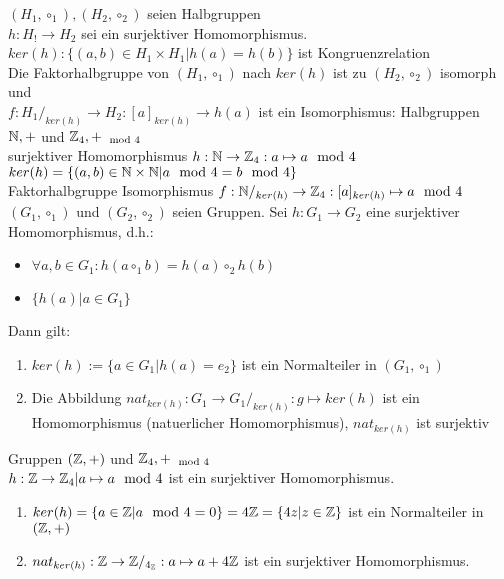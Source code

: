 \documentclass{../tudscript}
\begin{document}
$(H_1, \circ_1), (H_2,\circ_2)$ seien Halbgruppen\\
$h:H_! \rightarrow H_2$ sei ein surjektiver Homomorphismus.\\
$ker(h) : \{(a,b) \in H_1 \times H_1 | h(a) = h(b)\}$ ist Kongruenzrelation\\
Die Faktorhalbgruppe von $(H_1, \circ_1)$ nach $ker(h)$ ist zu $(H_2,\circ_2)$
isomorph und\\
$f: H_1/_{ker(h)} \rightarrow H_2 : [a]_{ker(h)} \rightarrow h(a)$ ist ein
Isomorphismus:
Halbgruppen $\mathbb{N},+$ und $\mathbb{Z}_4, +_{\mod 4}$\\
surjektiver Homomorphismus $h:\mathbb{N} \rightarrow \mathbb{Z}_4 : a \mapsto a \mod 4$\\
$ker(h) = \{(a,b) \in \mathbb{N} \times \mathbb{N} | a \mod 4 = b \mod 4\}$\\
Faktorhalbgruppe
Isomorphismus $f: \mathbb{N}/_{ker(h)} \rightarrow \mathbb{Z}_4:[a]_{ker(h)}\mapsto a \mod 4$
$(G_1, \circ_1)$ und $(G_2,\circ_2)$ seien Gruppen.
Sei $h:G_1 \rightarrow G_2$ eine surjektiver Homomorphismus, d.h.:
\begin{itemize}
\item $\forall a,b \in G_1 : h(a \circ_1 b) = h(a) \circ_2 h(b)$
\item $\{h(a) | a \in G_1\}$
\end{itemize}
Dann gilt:
\begin{enumerate}
  \item $ker(h):=\{a \in G_1 | h(a) =  e_2\}$ ist ein Normalteiler in
    $(G_1,\circ_1)$
    \item Die Abbildung $nat_{ker(h)}: G_1 \rightarrow G_1/_{ker(h)}:g \mapsto
      ker(h)$ ist ein Homomorphismus (natuerlicher Homomorphismus),
      $nat_{ker(h)}$ ist surjektiv
\end{enumerate}
Gruppen $(\mathbb{Z},+)$ und $\mathbb{Z}_4, +_{\mod 4}$\\
$h: \mathbb{Z} \rightarrow \mathbb{Z}_4 | a \mapsto a \mod 4$ ist ein surjektiver
Homomorphismus.
\begin{enumerate}
\item $ker(h) = \{a \in \mathbb{Z} | a \mod 4 = 0\} = 4 \mathbb{Z} = \{4z|z \in \mathbb{Z}\}$ ist ein
  Normalteiler in $(\mathbb{Z},+)$
  \item $nat_{ker(h)}:\mathbb{Z} \rightarrow \mathbb{Z}/_{4_{\mathbb{Z}}}:a \mapsto a + 4 \mathbb{Z}$ ist ein
    surjektiver Homomorphismus.
  \end{enumerate}
\end{document}
